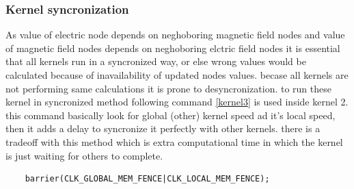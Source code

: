\subsubsection{Kernel syncronization}
As value of electric node depends on neghoboring magnetic field nodes and value of magnetic field nodes  depends on neghoboring elctric field nodes it is essential that all kernels run in a syncronized way, or else wrong values would be calculated because of inavailability of updated nodes values. becase all kernels are not performing same calculations it is prone to desyncronization. to run these kernel in syncronized method following command \ref{kernel3}  is used inside kernel 2. this command basically look for global (other) kernel speed ad it's local speed, then it adds a delay to syncronize it perfectly with other kernels. there is a tradeoff with this method which is extra computational time in which the kernel is just waiting for others to complete.
\lstset{language=C,caption=Kernel syncronization, label=kernel3}
\begin{lstlisting}
	barrier(CLK_GLOBAL_MEM_FENCE|CLK_LOCAL_MEM_FENCE);
\end{lstlisting}











